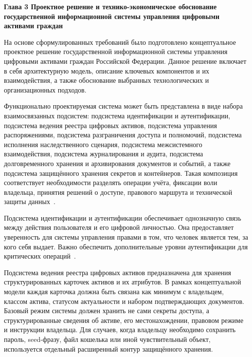 \newpage
\begin{center}
  \textbf{\large Глава 3 Проектное решение и технико-экономическое обоснование государственной информационной системы управления цифровыми активами граждан}
\end{center}
\setcounter{section}{0}


На основе сформулированных требований было подготовлено концептуальное проектное решение государственной информационной системы управления цифровыми активами граждан Российской Федерации. Данное решение включает в себя архитектурную модель, описание ключевых компонентов и их взаимодействия, а также обоснование выбранных технологических и организационных подходов.

Функционально проектируемая система может быть представлена в виде набора взаимосвязанных подсистем: подсистема идентификации и аутентификации, подсистема ведения реестра цифровых активов, подсистема управления распоряжениями, подсистема разграничения доступа и полномочий, подсистема исполнения наследственного сценария, подсистема межсистемного взаимодействия, подсистема журналирования и аудита, подсистема долговременного хранения и архивирования документов и событий, а также подсистема защищённого хранения секретов и контейнеров. Такая композиция соответствует необходимости разделять операции учёта, фиксации воли владельца, принятия решений о доступе, правового маршрута и технической защиты данных~\cite{nist80063_4_2025, iso27001_2022, iso14721_2025}.

Подсистема идентификации и аутентификации обеспечивает однозначную связь между действия пользователя и его цифровой личностью. Она предоставляет уверенность для системы управления правами в том, что человек является тем, за кого себя выдает. Важно обеспечить дополнительные уровни аутентификации для критических операций~\cite{nist80063_4_2025}.

Подсистема ведения реестра цифровых активов предназначена для хранения структурированных карточек активов и их атрибутов. В рамках концептуальной модели каждая карточка должна быть связана как минимум с владельцем, классом актива, статусом актуальности и набором подтверждающих документов. Базовый режим системы должен хранить не сами секреты доступа, а структурированные сведения об активе, его местонахождении, правовом режиме и инструкции владельца. Для случаев, когда владельцу необходимо сохранить пароль, seed-фразу, файл кошелька или иной чувствительный объект, используется отдельный расширенный контур защищённого хранения.

